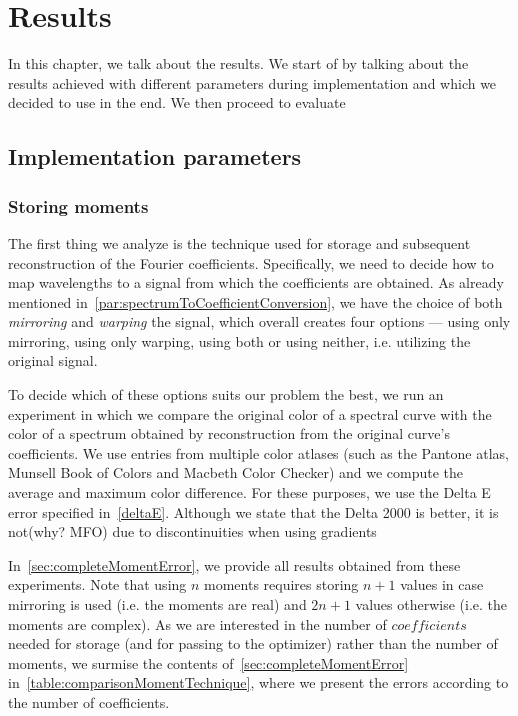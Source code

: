 \chapter{Results}

In this chapter, we talk about the results. We start of by talking about the results achieved with different parameters during implementation and which we decided to use in the end. We then proceed to evaluate

\section{Implementation parameters}

\subsection{Storing moments} \label{sec:storingMoments}

The first thing we analyze is the technique used for storage and subsequent reconstruction of the Fourier coefficients. Specifically, we need to decide how to map wavelengths to a signal from which the coefficients are obtained. As already mentioned in~\cref{par:spectrumToCoefficientConversion}, we have the choice of both \emph{mirroring} and \emph{warping} the signal, which overall creates four options --- using only mirroring, using only warping, using both or using neither, i.e. utilizing the original signal.

To decide which of these options suits our problem the best, we run an experiment in which we compare the original color of a spectral curve with the color of a spectrum obtained by reconstruction from the original curve's coefficients. We use entries from multiple color atlases (such as the Pantone atlas, Munsell Book of Colors and Macbeth Color Checker) and we compute the average and maximum color difference. For these purposes, we use the Delta E error specified in~\cref{deltaE}. Although we state that the Delta 2000 is better, it is not(why? MFO) due to  discontinuities when using gradients

In~\cref{sec:completeMomentError}, we provide all results obtained from these experiments. Note that using $n$ moments requires storing $n+1$ values in case mirroring is used (i.e. the moments are real) and $2n+1$ values otherwise (i.e. the moments are complex). As we are interested in the number of $coefficients$ needed for storage (and for passing to the optimizer) rather than the number of moments, we surmise the contents of~\cref{sec:completeMomentError} in~\cref{table:comparisonMomentTechnique}, where we present the errors according to the number of coefficients.

